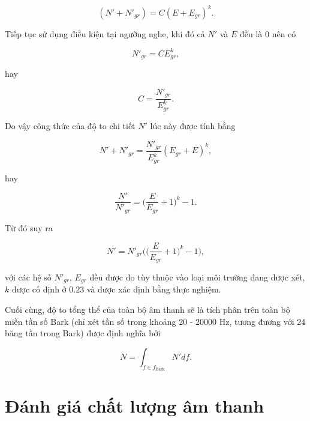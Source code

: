 			\begin{equation}
				(N' + N'_{gr}) = C (E + E_{gr})^k.
			\end{equation}
		
		Tiếp tục sử dụng điều kiện tại ngưỡng nghe, khi đó cả $N'$ và $E$ đều là $0$ nên có
		
			\begin{equation*}
				N'_{gr} = C E_{gr}^k,
			\end{equation*}
		
		\noindent hay
		
			\begin{equation}
				C = \frac{N'_{gr}}{E_{gr}^k}.
			\end{equation}
		
		Do vậy công thức của độ to chi tiết $N'$ lúc này được tính bằng
		
			\begin{equation*}
				N' + N'_{gr} = \frac{N'_{gr}}{E_{gr}^k} (E_{gr} + E)^k,
			\end{equation*}
		
		\noindent hay
		
			\begin{equation*}
				\frac{N'}{N'_{gr}} = \bigg( \frac{E}{E_{gr}} + 1 \bigg)^k - 1.
			\end{equation*}
		
		Từ đó suy ra
		
			\begin{equation}
				N' = N'_{gr} \bigg( \bigg( \frac{E}{E_{gr}} + 1 \bigg)^k - 1 \bigg),
				\label{sound::specific_loudness_formula}
			\end{equation}
		
		\noindent với các hệ số $N'_{gr}$, $E_{gr}$ đều được đo tùy thuộc vào loại môi trường đang được xét, $k$ được cố định ở $0.23$ và được xác định bằng thực nghiệm.
		
		Cuối cùng, độ to tổng thể của toàn bộ âm thanh sẽ là tích phân trên toàn bộ miền tần số Bark (chỉ xét tần số trong khoảng 20 - 20000 Hz, tương đương với 24 băng tần trong Bark) được định nghĩa bởi
		
			\begin{equation}
				N = \int_{f \in f_{\text{Bark}}} N' df.
				\label{sound::zwicker_loudness_formula}
			\end{equation}

\section{Đánh giá chất lượng âm thanh}
	
